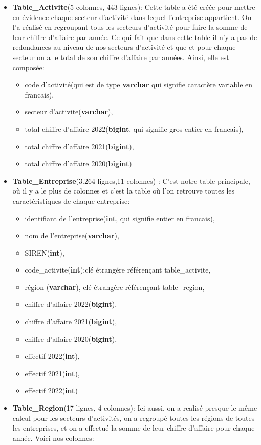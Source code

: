 \documentclass[mstat,12pt]{unswthesis}
\begin{document}
\begin{itemize}
\tightlist
\item
  \textbf{Table\_Activite}(5 colonnes, 443 lignes): Cette table a été
  créée pour mettre en évidence chaque secteur d'activité dans lequel
  l'entreprise appartient. On l'a réalisé en regroupant tous les
  secteurs d'activité pour faire la somme de leur chiffre d'affaire par
  année. Ce qui fait que dans cette table il n'y a pas de redondances au
  niveau de nos secteurs d'activité et que et pour chaque secteur on a
  le total de son chiffre d'affaire par années. Ainsi, elle est
  composée:

  \begin{itemize}
  \tightlist
  \item
    code d'activité(qui est de type \textbf{varchar} qui signifie
    caractère variable en francais),
  \item
    secteur d'activite(\textbf{varchar}),
  \item
    total chiffre d'affaire 2022(\textbf{bigint}, qui signifie gros
    entier en francais),
  \item
    total chiffre d'affaire 2021(\textbf{bigint}),
  \item
    total chiffre d'affaire 2020(\textbf{bigint})
  \end{itemize}
\item
  \textbf{Table\_Entreprise}(3.264 lignes,11 colonnes) : C'est notre
  table principale, où il y a le plus de colonnes et c'est la table où
  l'on retrouve toutes les caractéristiques de chaque entreprise:

  \begin{itemize}
  \tightlist
  \item
    identifiant de l'entreprise(\textbf{int}, qui signifie entier en
    francais),
  \item
    nom de l'entreprise(\textbf{varchar}),
  \item
    SIREN(\textbf{int}),
  \item
    code\_activite(\textbf{int}):clé étrangére référençant
    table\_activite,
  \item
    région (\textbf{varchar}), clé étrangére référençant table\_region,
  \item
    chiffre d'affaire 2022(\textbf{bigint}),
  \item
    chiffre d'affaire 2021(\textbf{bigint}),
  \item
    chiffre d'affaire 2020(\textbf{bigint}),
  \item
    effectif 2022(\textbf{int}),
  \item
    effectif 2021(\textbf{int}),
  \item
    effectif 2022(\textbf{int})
  \end{itemize}
\item
  \textbf{Table\_Region}(17 lignes, 4 colonnes): Ici aussi, on a realisé
  presque le même calcul pour les secteurs d'activités, on a regroupé
  toutes les régions de toutes les entreprises, et on a effectué la
  somme de leur chiffre d'affaire pour chaque année. Voici nos colonnes:


\end{itemize}
\end{document}

